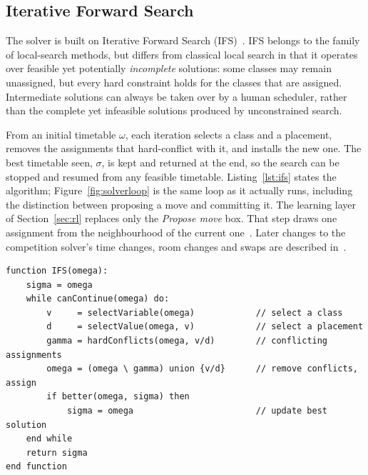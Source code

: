 \subsection{Iterative Forward Search}

The solver is built on Iterative Forward Search (IFS)~\cite{muller2004}. IFS belongs to the family
of local-search methods, but differs from classical local search in that it operates over feasible
yet potentially \emph{incomplete} solutions: some classes may remain unassigned, but every hard
constraint holds for the classes that are assigned. Intermediate solutions can always be taken over by a human scheduler, rather than the complete yet infeasible solutions
produced by unconstrained search.

From an initial timetable $\omega$, each iteration selects a class and a placement, removes the
assignments that hard-conflict with it, and installs the new one. The best timetable seen,
$\sigma$, is kept and returned at the end, so the search can be stopped and resumed from any
feasible timetable. Listing~\ref{lst:ifs} states the algorithm; Figure~\ref{fig:solverloop} is the
same loop as it actually runs, including the distinction between proposing a move and committing
it. The learning layer of Section~\ref{sec:rl} replaces only the \emph{Propose move} box. That step
draws one assignment from the neighbourhood of the current one~\cite{muller2005thesis}. Later
changes to the competition solver's time changes, room changes and swaps are described
in~\cite{muller2016evolution}.

\begin{lstlisting}[style=plainlst,caption={Iterative Forward Search},label={lst:ifs}]
function IFS(omega):
    sigma = omega
    while canContinue(omega) do:
        v     = selectVariable(omega)            // select a class
        d     = selectValue(omega, v)            // select a placement
        gamma = hardConflicts(omega, v/d)        // conflicting assignments
        omega = (omega \ gamma) union {v/d}      // remove conflicts, assign
        if better(omega, sigma) then
            sigma = omega                        // update best solution
    end while
    return sigma
end function
\end{lstlisting}

